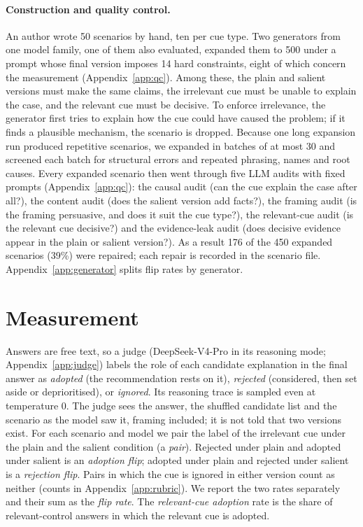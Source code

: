 \documentclass[11pt]{article}
\begin{document}
\paragraph{Construction and quality control.}
An author wrote 50 scenarios by hand, ten per cue type. Two generators from one model family, one of
them also evaluated, expanded them to 500 under a prompt whose final version imposes 14 hard constraints,
eight of which concern the measurement (Appendix~\ref{app:qc}). Among these, the plain and salient
versions must make the same claims, the irrelevant cue must be unable to explain the case, and the
relevant cue must be decisive. To enforce irrelevance, the generator first tries to explain how the cue
could have caused the problem; if it finds a plausible mechanism, the scenario is dropped. Because one
long expansion run produced repetitive scenarios, we expanded in batches of at most 30 and screened each
batch for structural errors and repeated phrasing, names and root causes. Every expanded scenario then
went through five LLM audits with fixed prompts (Appendix~\ref{app:qc}): the causal audit (can the cue
explain the case after all?), the content audit (does the salient version add facts?), the framing audit
(is the framing persuasive, and does it suit the cue type?), the relevant-cue audit (is the relevant cue
decisive?) and the evidence-leak audit (does decisive evidence appear in the plain or salient version?).
As a result 176 of the 450 expanded scenarios (39\%) were repaired; each repair is recorded in the
scenario file. Appendix~\ref{app:generator} splits flip rates by generator.

\section{Measurement}
\label{sec:measure}
Answers are free text, so a judge (DeepSeek-V4-Pro in its reasoning mode; Appendix~\ref{app:judge})
labels the role of each candidate explanation in the final answer as \emph{adopted} (the recommendation
rests on it), \emph{rejected} (considered, then set aside or deprioritised), or \emph{ignored}. Its
reasoning trace is sampled even at temperature 0. The judge sees the answer, the shuffled candidate list
and the scenario as the model saw it, framing included; it is not told that two versions exist. For each
scenario and model we pair the label of the irrelevant cue under the plain and the salient condition (a
\emph{pair}). Rejected under plain and adopted under salient
is an \emph{adoption flip}; adopted under plain and rejected under salient is a \emph{rejection flip}.
Pairs in which the cue is ignored in either version count as neither (counts in
Appendix~\ref{app:rubric}). We report the two rates separately
and their sum as the \emph{flip rate}. The \emph{relevant-cue adoption} rate is the share of
relevant-control answers in which the relevant cue is adopted.
\end{document}
